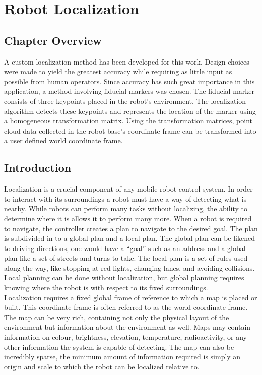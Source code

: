 \chapter{Robot Localization}
\label{chap:localiz}
\section{Chapter Overview}
A custom localization method has been developed for this work. Design choices were made to yield the greatest accuracy while requiring as little input as possible from human operators. Since accuracy has such great importance in this application, a method involving fiducial markers was chosen. The fiducial marker consists of three keypoints placed in the robot's environment. The localization algorithm detects these keypoints and represents the location of the marker using a homogeneous transformation matrix. Using the transformation matrices, point cloud data collected in the robot base's coordinate frame can be transformed into a user defined world coordinate frame.\\

\section{Introduction}
Localization is a crucial component of any mobile robot control system. In order to interact with its surroundings a robot must have a way of detecting what is nearby. While robots can perform many tasks without localizing, the ability to determine where it is allows it to perform many more. When a robot is required to navigate, the controller creates a plan to navigate to the desired goal. The plan is subdivided in to a global plan and a local plan. The global plan can be likened to driving directions, one would have a ``goal'' such as an address and a global plan like a set of streets and turns to take. The local plan is a set of rules used along the way, like stopping at red lights, changing lanes, and avoiding collisions. Local planning can be done without localization, but global planning requires knowing where the robot is with respect to its fixed surroundings.\\

Localization requires a fixed global frame of reference to which a map is placed or built. This coordinate frame is often referred to as the world coordinate frame. The map can be very rich, containing not only the physical layout of the environment but information about the environment as well. Maps may contain information on colour, brightness, elevation, temperature, radioactivity, or any other information the system is capable of detecting. The map can also be incredibly sparse, the minimum amount of information required is simply an origin and scale to which the robot can be localized relative to.\\

